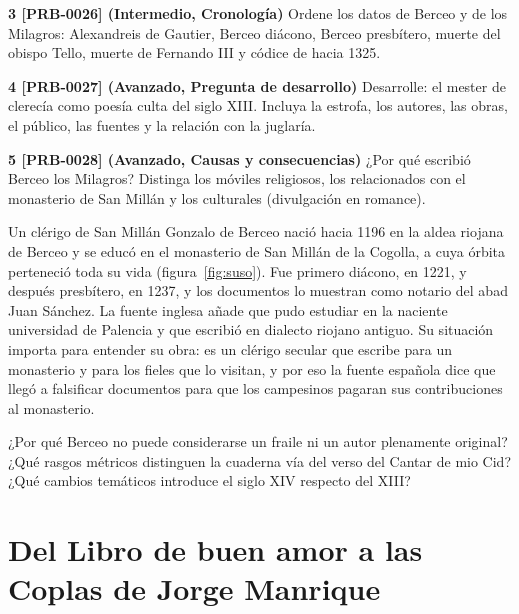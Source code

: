 \documentclass{book}
\begin{document}
\begin{tcolorbox}[title={Ejercicios}, studiumworked, breakable]
\noindent\textbf{3 [PRB-0026] (Intermedio, Cronología)}
Ordene los datos de Berceo y de los Milagros: Alexandreis de Gautier, Berceo diácono, Berceo presbítero, muerte del obispo Tello, muerte de Fernando III y códice de hacia 1325.


\noindent\textbf{4 [PRB-0027] (Avanzado, Pregunta de desarrollo)}
Desarrolle: el mester de clerecía como poesía culta del siglo XIII. Incluya la estrofa, los autores, las obras, el público, las fuentes y la relación con la juglaría.


\noindent\textbf{5 [PRB-0028] (Avanzado, Causas y consecuencias)}
¿Por qué escribió Berceo los Milagros? Distinga los móviles religiosos, los relacionados con el monasterio de San Millán y los culturales (divulgación en romance).

\end{tcolorbox}

\begin{tcolorbox}[title={Autoficha}, studiumcheck, breakable]

Un clérigo de San Millán
Gonzalo de Berceo nació hacia 1196 en la aldea riojana de Berceo y se educó en el monasterio de San Millán de la Cogolla, a cuya órbita perteneció toda su vida (figura~\ref{fig:suso}). Fue primero diácono, en 1221, y después presbítero, en 1237, y los documentos lo muestran como notario del abad Juan Sánchez. La fuente inglesa añade que pudo estudiar en la naciente universidad de Palencia y que escribió en dialecto riojano antiguo. Su situación importa para entender su obra: es un clérigo secular que escribe para un monasterio y para los fieles que lo visitan, y por eso la fuente española dice que llegó a falsificar documentos para que los campesinos pagaran sus contribuciones al monasterio.


¿Por qué Berceo no puede considerarse un fraile ni un autor plenamente original? ¿Qué rasgos métricos distinguen la cuaderna vía del verso del Cantar de mio Cid? ¿Qué cambios temáticos introduce el siglo XIV respecto del XIII?

\end{tcolorbox}

\chapter{Del Libro de buen amor a las Coplas de Jorge Manrique}
\label{chap:lit-03}
\end{document}
